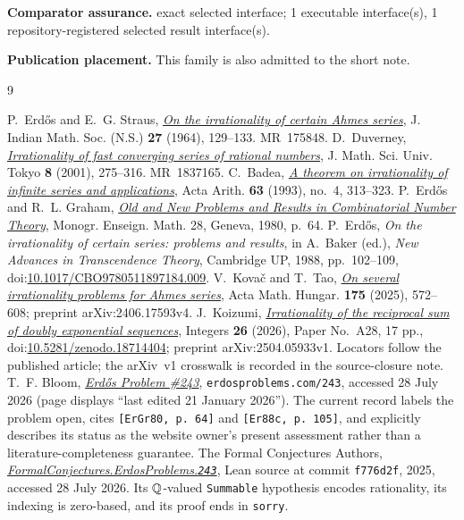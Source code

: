 \documentclass[11pt]{article}
\begin{document}
\textbf{Comparator assurance.} exact selected interface; 1 executable interface(s), 1 repository-registered selected result interface(s).

\textbf{Publication placement.} This family is also admitted to the short note.
\begin{thebibliography}{9}
\small
\raggedright
\setlength{\itemsep}{0pt}
 P.~Erd\H{o}s and E.~G. Straus,
  \href{https://users.renyi.hu/~p_erdos/1964-19.pdf}{\emph{On the irrationality
  of certain Ahmes series}},
  J. Indian Math. Soc. (N.S.) \textbf{27} (1964), 129--133. MR~175848.
 D.~Duverney,
  \href{https://www.ms.u-tokyo.ac.jp/journal/pdf/jms080206.pdf}
  {\emph{Irrationality of fast converging series of rational numbers}},
  J. Math. Sci. Univ. Tokyo \textbf{8} (2001), 275--316. MR~1837165.
 C.~Badea,
  \href{https://matwbn.icm.edu.pl/ksiazki/aa/aa63/aa6342.pdf}{\emph{A theorem
  on irrationality of infinite series and applications}}, Acta Arith.
  \textbf{63} (1993), no.~4, 313--323.
 P.~Erd\H{o}s and R.~L. Graham,
  \href{https://mathweb.ucsd.edu/~ronspubs/80_11_number_theory.pdf}{\emph{Old
  and New Problems and Results in Combinatorial Number Theory}},
  Monogr. Enseign. Math. 28, Geneva, 1980, p.~64.
 P.~Erd\H{o}s, \emph{On the irrationality of certain series:
  problems and results}, in A.~Baker (ed.), \emph{New Advances in Transcendence
  Theory}, Cambridge UP, 1988, pp.~102--109,
  doi:\href{https://doi.org/10.1017/CBO9780511897184.009}{10.1017/CBO9780511897184.009}.
 V.~Kova\v{c} and T.~Tao,
  \href{https://arxiv.org/abs/2406.17593}{\emph{On several irrationality
  problems for Ahmes series}}, Acta Math. Hungar. \textbf{175} (2025),
  572--608; preprint arXiv:2406.17593v4.
 J.~Koizumi,
  \href{https://math.colgate.edu/~integers/aa28/aa28.pdf}
  {\emph{Irrationality of the reciprocal sum of doubly exponential sequences}},
  Integers \textbf{26} (2026), Paper No.~A28, 17 pp.,
  doi:\href{https://doi.org/10.5281/zenodo.18714404}{10.5281/zenodo.18714404};
  preprint arXiv:2504.05933v1.  Locators follow the published article;
  the arXiv~v1 crosswalk is recorded in the source-closure note.
 T.~F. Bloom,
  \href{https://www.erdosproblems.com/243}{\emph{Erd\H{o}s Problem \#243}},
  \texttt{erdosproblems.com/243}, accessed 28 July 2026 (page displays
  ``last edited 21 January 2026'').  The current record labels the problem
  open, cites \texttt{[ErGr80, p.~64]} and \texttt{[Er88c, p.~105]}, and
  explicitly describes its status as the website owner's present assessment
  rather than a literature-completeness guarantee.
 The Formal Conjectures Authors,
  \href{https://github.com/google-deepmind/formal-conjectures/blob/f776d2f2039351b00737ffcafb9d7d7666e1d9af/FormalConjectures/ErdosProblems/243.lean}
  {\emph{FormalConjectures.ErdosProblems.\texttt{243}}},
  Lean source at commit \texttt{f776d2f}, 2025, accessed 28 July 2026.
  Its $\mathbb{Q}$-valued \texttt{Summable} hypothesis encodes rationality, its
  indexing is zero-based, and its proof ends in \texttt{sorry}.
\end{thebibliography}
\end{document}
